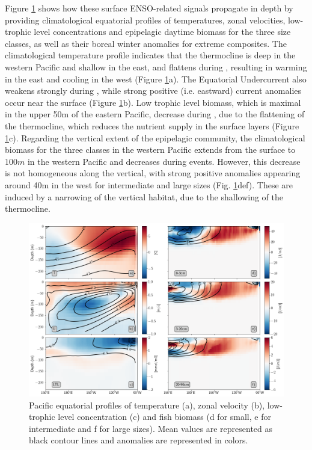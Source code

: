 Figure \ref{fig:profiles} shows how these surface ENSO-related signals propagate in depth by providing climatological equatorial profiles of temperatures, zonal velocities, low-trophic level concentrations and epipelagic daytime biomass for the three size classes, as well as their boreal winter anomalies for extreme \nino{} composites. The climatological temperature profile indicates that the thermocline is deep in the western Pacific and shallow in the east, and flattens during \nino{}, resulting in warming in the east and cooling in the west (Figure  \ref{fig:profiles}a). The Equatorial Undercurrent also weakens strongly during \nino{}, while strong positive (i.e. eastward) current anomalies occur near the surface (Figure  \ref{fig:profiles}b). Low trophic level biomass, which is maximal in the upper 50m of the eastern Pacific, decrease during \nino{}, due to the flattening of the thermocline, which reduces the nutrient supply in the surface layers (Figure \ref{fig:profiles}c). Regarding the vertical extent of the epipelagic community, the climatological biomass for the three classes in the western Pacific extends from the surface to $100m$ in the western Pacific and decreases during \nino{} events. However, this decrease is not homogeneous along the vertical, with strong positive anomalies appearing around 40m in the west for intermediate and large sizes (Fig. \ref{fig:profiles}def). These are induced by a narrowing of the vertical habitat, due to the shallowing of the thermocline. 

\begin{figure}[h!tp]
	\centering
	\includegraphics[scale=0.4]{figs/forage_mean_ond97.png}	
	\caption{Pacific equatorial profiles of temperature (a), zonal velocity (b), low-trophic level concentration (c) and fish biomass (d for small, e for intermediate and f for large sizes). Mean values are represented as black contour lines and \nino{} anomalies are represented in colors.}	
	\label{fig:profiles}
\end{figure}

